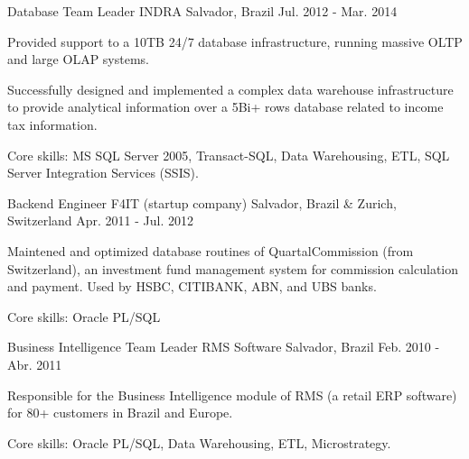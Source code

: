 \begin{cventries}

\cventry
{Database Team Leader} %
{INDRA} %
{Salvador, Brazil} %
{Jul. 2012 - Mar. 2014} %
{ %
\begin{cvitems}
	\item{Provided support to a 10TB 24/7 database infrastructure, running massive OLTP and large OLAP systems.}
	\item{Successfully designed and implemented a complex data warehouse infrastructure to provide analytical information over a 5Bi+ rows database related to income tax information.}
	\item{Core skills: MS SQL Server 2005, Transact-SQL, Data Warehousing, ETL, SQL Server Integration Services (SSIS).}
\end{cvitems} 
}


\cventry
{Backend Engineer} %
{F4IT (startup company)} %
{Salvador, Brazil \& Zurich, Switzerland} %
{Apr. 2011 - Jul. 2012} %
{ %
\begin{cvitems}
	\item{Maintened and optimized database routines of QuartalCommission (from Switzerland), an investment fund management system for commission calculation and payment. Used by HSBC, CITIBANK, ABN, and UBS banks.}
	\item{Core skills: Oracle PL/SQL}
\end{cvitems}
}


\cventry
{Business Intelligence Team Leader} %
{RMS Software} %
{Salvador, Brazil} %
{Feb. 2010 - Abr. 2011} %
{ %
\begin{cvitems}
	\item{Responsible for the Business Intelligence module of RMS (a retail ERP software) for 80+ customers in Brazil and Europe.}
	\item{Core skills: Oracle PL/SQL, Data Warehousing, ETL, Microstrategy.}
\end{cvitems}
}



\end{cventries}
